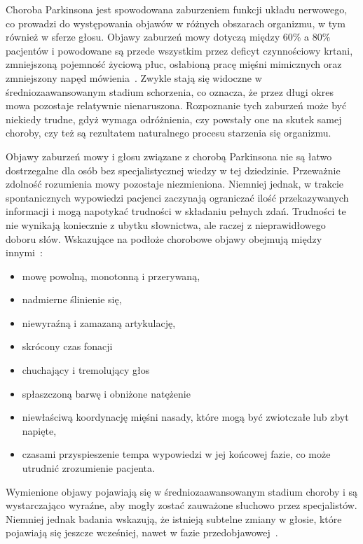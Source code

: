 Choroba Parkinsona jest spowodowana zaburzeniem funkcji układu nerwowego, co prowadzi do występowania objawów w różnych obszarach organizmu, w tym również w sferze głosu.
Objawy zaburzeń mowy dotyczą między 60\% a 80\% pacjentów i powodowane są przede wszystkim przez deficyt czynnościowy krtani,
zmniejszoną pojemność życiową płuc, osłabioną pracę mięśni mimicznych oraz zmniejszony napęd mówienia~\cite{lewicka}.
Zwykle stają się widoczne w średniozaawansowanym stadium schorzenia, co oznacza, że przez długi okres mowa pozostaje relatywnie nienaruszona.
Rozpoznanie tych zaburzeń może być niekiedy trudne, gdyż wymaga odróżnienia, czy powstały one na skutek samej choroby, czy też są rezultatem naturalnego
procesu starzenia się organizmu.

Objawy zaburzeń mowy i głosu związane z chorobą Parkinsona nie są łatwo dostrzegalne dla osób bez specjalistycznej wiedzy w tej dziedzinie.
Przeważnie zdolność rozumienia mowy pozostaje niezmieniona.
Niemniej jednak, w trakcie spontanicznych wypowiedzi pacjenci zaczynają ograniczać ilość przekazywanych informacji i mogą napotykać trudności w składaniu
pełnych zdań.
Trudności te nie wynikają koniecznie z ubytku słownictwa, ale raczej z nieprawidłowego doboru słów.
Wskazujące na podłoże chorobowe objawy obejmują między innymi~\cite{Szurek_2018, Kurylowicz_2019}:
\begin{itemize}[itemsep=0.1pt]
	\item mowę powolną, monotonną i przerywaną,
	\item nadmierne ślinienie się,
	\item niewyraźną i zamazaną artykulację,
	\item skrócony czas fonacji
	\item chuchający i tremolujący głos
	\item spłaszczoną barwę i obniżone natężenie
	\item niewłaściwą koordynację mięśni nasady, które mogą być zwiotczałe lub zbyt napięte,
	\item czasami przyspieszenie tempa wypowiedzi w jej końcowej fazie, co może utrudnić zrozumienie pacjenta.
\end{itemize}

Wymienione objawy pojawiają się w średniozaawansowanym stadium choroby i są wystarczająco wyraźne, aby mogły zostać zauważone słuchowo przez specjalistów.
Niemniej jednak badania wskazują, że istnieją subtelne zmiany w głosie, które pojawiają się jeszcze wcześniej, nawet w fazie przedobjawowej~\cite{2023_PD_voice}.

